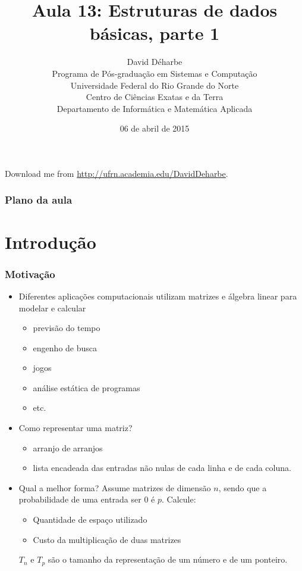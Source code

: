 \documentclass{beamer}
\title{Aula 13: Estruturas de dados básicas, parte 1}
\author{David Déharbe \\
  Programa de Pós-graduação em Sistemas e Computação \\
  Universidade Federal do Rio Grande do Norte \\
  Centro de Ciências Exatas e da Terra \\
  Departamento de Informática e Matemática Aplicada}
\date{06 de abril de 2015}
\begin{document}
\begin{frame}
  \titlepage
  Download me from \url{http://ufrn.academia.edu/DavidDeharbe}.
\end{frame}

\begin{frame}
  \frametitle{Plano da aula}
  \tableofcontents
\end{frame}

\section{Introdução}

\begin{frame}
  \frametitle{Motivação}

  \begin{itemize}
  \item Diferentes aplicações computacionais utilizam
    matrizes e álgebra linear para modelar e calcular
    \begin{itemize}
      \item previsão do tempo
      \item engenho de busca
      \item jogos
      \item análise estática de programas
      \item etc.
    \end{itemize}
  \item Como representar uma matriz?
    \pause
    \begin{itemize}
      \item \alert{arranjo de arranjos}
      \item \alert{lista encadeada} das entradas não nulas de cada linha e de
        cada coluna.
    \end{itemize}
  \item Qual a melhor forma?
    \pause
    Assume matrizes de dimensão $n$, sendo que a probabilidade de uma 
    entrada ser 0 é $p$. Calcule:
    \begin{itemize}
      \item Quantidade de espaço utilizado
      \item Custo da multiplicação de duas matrizes
    \end{itemize}
    $T_n$ e $T_p$ são o tamanho da representação de um número e
    de um ponteiro.
  \end{itemize}

\end{frame}
\end{document}
